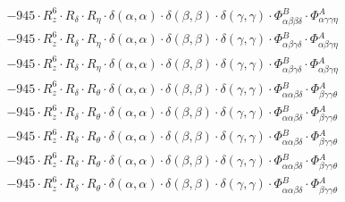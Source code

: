 \documentclass{article}
\begin{document}
\begin{subequations}
\begin{gather}
\begin{array}{c}
 \\[0.2em] 		 - 945 \cdot R_{z}^{6} \cdot R_{\delta{}} \cdot R_{\eta{}} \cdot \delta{}\left(\alpha{}, \alpha{}\right) \cdot \delta{}\left(\beta{}, \beta{}\right) \cdot \delta{}\left(\gamma{}, \gamma{}\right) \cdot \Phi{}^{B}_{\alpha{}\beta{}\beta{}\delta{}} \cdot \Phi{}^{A}_{\alpha{}\gamma{}\gamma{}\eta{}} 
 \\[0.2em] 		 - 945 \cdot R_{z}^{6} \cdot R_{\delta{}} \cdot R_{\eta{}} \cdot \delta{}\left(\alpha{}, \alpha{}\right) \cdot \delta{}\left(\beta{}, \beta{}\right) \cdot \delta{}\left(\gamma{}, \gamma{}\right) \cdot \Phi{}^{B}_{\alpha{}\beta{}\gamma{}\delta{}} \cdot \Phi{}^{A}_{\alpha{}\beta{}\gamma{}\eta{}} 
 \\[0.2em] 		 - 945 \cdot R_{z}^{6} \cdot R_{\delta{}} \cdot R_{\eta{}} \cdot \delta{}\left(\alpha{}, \alpha{}\right) \cdot \delta{}\left(\beta{}, \beta{}\right) \cdot \delta{}\left(\gamma{}, \gamma{}\right) \cdot \Phi{}^{B}_{\alpha{}\beta{}\gamma{}\delta{}} \cdot \Phi{}^{A}_{\alpha{}\beta{}\gamma{}\eta{}} 
 \\[0.2em] 		 - 945 \cdot R_{z}^{6} \cdot R_{\delta{}} \cdot R_{\theta{}} \cdot \delta{}\left(\alpha{}, \alpha{}\right) \cdot \delta{}\left(\beta{}, \beta{}\right) \cdot \delta{}\left(\gamma{}, \gamma{}\right) \cdot \Phi{}^{B}_{\alpha{}\alpha{}\beta{}\delta{}} \cdot \Phi{}^{A}_{\beta{}\gamma{}\gamma{}\theta{}} 
 \\[0.2em] 		 - 945 \cdot R_{z}^{6} \cdot R_{\delta{}} \cdot R_{\theta{}} \cdot \delta{}\left(\alpha{}, \alpha{}\right) \cdot \delta{}\left(\beta{}, \beta{}\right) \cdot \delta{}\left(\gamma{}, \gamma{}\right) \cdot \Phi{}^{B}_{\alpha{}\alpha{}\beta{}\delta{}} \cdot \Phi{}^{A}_{\beta{}\gamma{}\gamma{}\theta{}} 
 \\[0.2em] 		 - 945 \cdot R_{z}^{6} \cdot R_{\delta{}} \cdot R_{\theta{}} \cdot \delta{}\left(\alpha{}, \alpha{}\right) \cdot \delta{}\left(\beta{}, \beta{}\right) \cdot \delta{}\left(\gamma{}, \gamma{}\right) \cdot \Phi{}^{B}_{\alpha{}\alpha{}\beta{}\delta{}} \cdot \Phi{}^{A}_{\beta{}\gamma{}\gamma{}\theta{}} 
 \\[0.2em] 		 - 945 \cdot R_{z}^{6} \cdot R_{\delta{}} \cdot R_{\theta{}} \cdot \delta{}\left(\alpha{}, \alpha{}\right) \cdot \delta{}\left(\beta{}, \beta{}\right) \cdot \delta{}\left(\gamma{}, \gamma{}\right) \cdot \Phi{}^{B}_{\alpha{}\alpha{}\beta{}\delta{}} \cdot \Phi{}^{A}_{\beta{}\gamma{}\gamma{}\theta{}} 
 \\[0.2em] 		 - 945 \cdot R_{z}^{6} \cdot R_{\delta{}} \cdot R_{\theta{}} \cdot \delta{}\left(\alpha{}, \alpha{}\right) \cdot \delta{}\left(\beta{}, \beta{}\right) \cdot \delta{}\left(\gamma{}, \gamma{}\right) \cdot \Phi{}^{B}_{\alpha{}\alpha{}\beta{}\delta{}} \cdot \Phi{}^{A}_{\beta{}\gamma{}\gamma{}\theta{}} 

\end{array}
\end{gather}
\end{subequations}
\end{document}
